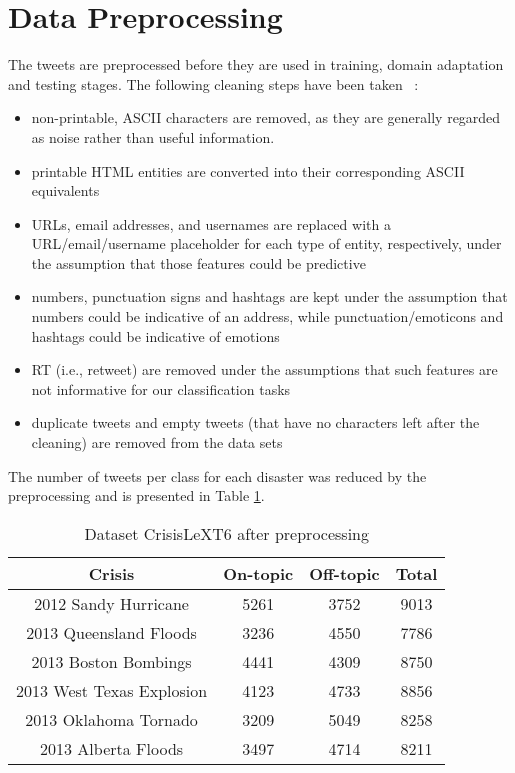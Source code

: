\section{Data Preprocessing}
\label{datapreprocessing}

The tweets are preprocessed before they are used in training, domain adaptation and testing stages.
The following cleaning steps have been taken ~\citep{twitterda}:

\begin{itemize}
  \item non-printable, ASCII characters are removed, as they are generally regarded as noise rather than useful information.
  \item printable HTML entities are converted into their corresponding ASCII equivalents
  \item URLs, email addresses, and usernames are replaced with a URL/email/username placeholder for each type of entity, respectively, under the assumption that those features could be predictive 
  \item numbers, punctuation signs and hashtags are kept under the assumption that numbers could be indicative of an address, while punctuation/emoticons and hashtags could be indicative of emotions 
  \item RT (i.e., retweet) are removed under the assumptions that such features are not informative for our classification tasks
  \item duplicate tweets and empty tweets (that have no characters left after the cleaning) are removed from the data sets
\end{itemize}

The number of tweets per class for each disaster was reduced by the preprocessing and is presented in Table \ref{aftercleaningdatasettable}.

\begin{table}[ht]
    \begin{center}
    \caption{Dataset CrisisLeXT6 after preprocessing}
    \begin{tabular}[c]{|c|c|c|c|}
        \hline
        Crisis & On-topic & Off-topic & Total \\
        \hline
        2012 Sandy Hurricane & 5261 & 3752 & 9013 \\
        2013 Queensland Floods & 3236 & 4550 & 7786 \\ 
        2013 Boston Bombings & 4441 & 4309 & 8750 \\ 
        2013 West Texas Explosion & 4123 & 4733 & 8856 \\
        2013 Oklahoma Tornado & 3209 & 5049 & 8258 \\
        2013 Alberta Floods & 3497 & 4714 & 8211 \\
        \hline
    \end{tabular}
    \label{aftercleaningdatasettable}
   \end{center}
\end{table}

